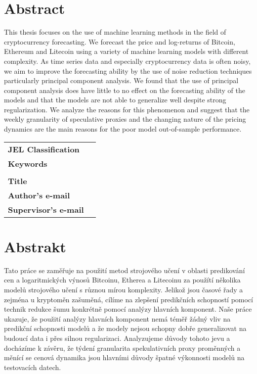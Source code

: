 \section*{Abstract}

This thesis focuses on the use of machine learning
methods in the field of cryptocurrency forecasting. 
We forecast the price and log-returns of Bitcoin, Ethereum and Litecoin
using a variety of machine learning models with different complexity.
As time series
data and especially cryptocurrency data is often noisy, we aim to improve the	
forecasting ability by the use of noise reduction techniques particularly 
principal component analysis.
We found that the use of principal component analysis
does have little to no effect on the forecasting ability of the models
and that the models are not able to generalize well despite 
strong regularization. 
We analyze the reasons for this phenomenon and suggest that the
weekly granularity of speculative proxies 
and the changing nature of the pricing dynamics
are the main reasons for the poor model out-of-sample performance.


\bigskip

\begin{tabular}{lp{8.6cm}}
		\textbf{JEL Classification} & \JEL \\
		\textbf{Keywords} & \Keywords \\
 		& \\
		\textbf{Title} & \Bookname \\
 		\textbf{Author's e-mail} & \texttt{\href{mailto:\Email}{\Email}}\\
		\textbf{Supervisor's e-mail} & \texttt{\href{mailto:\EmailSup}{\EmailSup}}\\
\end{tabular}

\bigskip

\section*{Abstrakt}\label{abstract}
Tato práce se zaměřuje na použití metod strojového učení v oblasti
predikování cen a logaritmických výnosů Bitcoinu, Etherea a Litecoinu
za použítí několika modelů strojového učení s různou mírou komplexity.
Jelikož jsou časové řady a zejména u kryptoměn zašuměná, cílíme
na zlepšení predikčních schopností pomocí technik redukce šumu 
konkrétně pomocí analýzy hlavních komponent.
Naše práce ukazuje, že použití analýzy hlavních komponent
nemá téměř žádný vliv na predikční schopnosti modelů
a že modely nejsou schopny dobře generalizovat na budoucí data
i přes silnou regularizaci. Analyzujeme
důvody tohoto jevu a docházíme k závěru, že
týdení granularita spekulativních proxy proměnných a měnící se cenová dynamika 
jsou hlavními důvody špatné výkonnosti modelů na testovacích datech.

